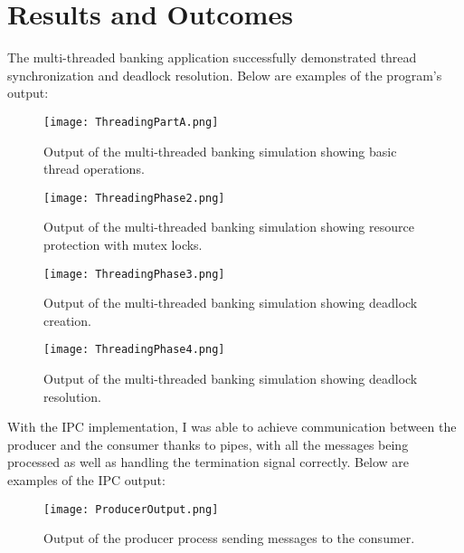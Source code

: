 \documentclass{article}
\begin{document}
\section*{Results and Outcomes}

The multi-threaded banking application successfully demonstrated thread synchronization and deadlock resolution. Below are examples of the program's output:

\begin{figure}[H] %
    \centering
    \texttt{[image: ThreadingPartA.png]}
    \caption{Output of the multi-threaded banking simulation showing basic thread operations.}
    \label{fig:threading_part_a}
\end{figure}

\begin{figure}[H] %
    \centering
    \texttt{[image: ThreadingPhase2.png]}
    \caption{Output of the multi-threaded banking simulation showing resource protection with mutex locks.}
    \label{fig:threading_phase2}
\end{figure}

\begin{figure}[H] %
    \centering
    \texttt{[image: ThreadingPhase3.png]}
    \caption{Output of the multi-threaded banking simulation showing deadlock creation.}
    \label{fig:threading_phase3}
\end{figure}

\begin{figure}[H] %
    \centering
    \texttt{[image: ThreadingPhase4.png]}
    \caption{Output of the multi-threaded banking simulation showing deadlock resolution.}
    \label{fig:threading_phase4}
\end{figure}

With the IPC implementation, I was able to achieve communication between the producer and the consumer thanks to pipes, with all the messages being processed as well as handling the termination signal correctly. Below are examples of the IPC output:

\begin{figure}[H] %
    \centering
    \texttt{[image: ProducerOutput.png]}
    \caption{Output of the producer process sending messages to the consumer.}
    \label{fig:producer_output}
\end{figure}
\end{document}
